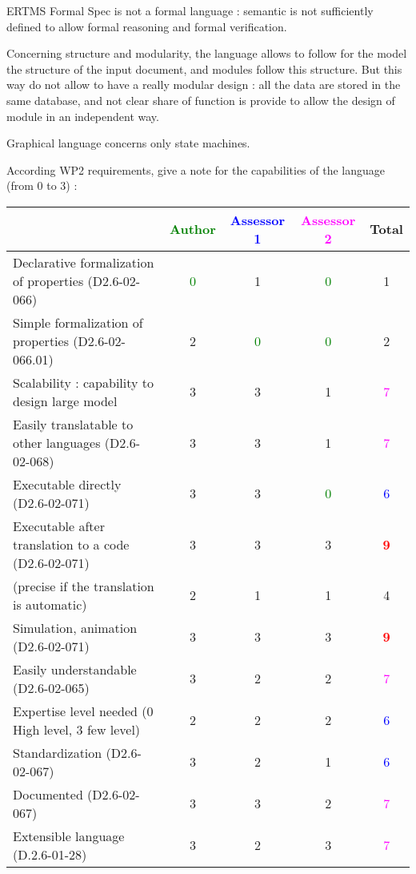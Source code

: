 \begin{assessor2}
ERTMS Formal Spec is not a formal language :  semantic is not sufficiently defined to allow formal  reasoning and formal verification.

Concerning structure and modularity, the language allows to follow for the model the structure of the input document, and modules follow this structure. But this way do not allow to have a really modular design :  all the data are stored in the same database, and not clear share of function is provide to allow the design of module in an independent way.

Graphical language concerns only state machines.
\end{assessor2}

According WP2 requirements, give a note for the capabilities of the language (from 0 to 3) :

\begin{tabular}{|l | c | c | c | c|}
\hline
& \textcolor{green}{Author} & \textcolor{blue}{Assessor 1} & \textcolor{magenta}{Assessor 2} & Total \\
\hline
Declarative formalization of properties (D2.6-02-066) & \textcolor{green}{0} & 1     & \textcolor{green}{0} & 1     \\
\hline
Simple formalization of properties (D2.6-02-066.01) & 2     & \textcolor{green}{0} & \textcolor{green}{0} & 2     \\
\hline
Scalability : capability to design large model & 3     & 3     & 1     & \textcolor{magenta}{7} \\
\hline
Easily translatable to other languages (D2.6-02-068) & 3     & 3     & 1     & \textcolor{magenta}{7} \\
\hline
Executable directly (D2.6-02-071) & 3     & 3     & \textcolor{green}{0} & \textcolor{blue}{6} \\
\hline
Executable after translation to a code (D2.6-02-071) & 3     & 3     & 3     & \textcolor{red}{\textbf{9}} \\
(precise if the translation is automatic) & 2     & 1     & 1     & 4     \\
\hline
Simulation, animation (D2.6-02-071) & 3     & 3     & 3     & \textcolor{red}{\textbf{9}} \\
\hline
Easily understandable (D2.6-02-065) & 3     & 2     & 2     & \textcolor{magenta}{7} \\
\hline
Expertise level needed (0 High level, 3 few level) & 2     & 2     & 2     & \textcolor{blue}{6} \\
\hline
Standardization (D2.6-02-067) & 3     & 2     & 1     & \textcolor{blue}{6} \\
\hline
Documented (D2.6-02-067) & 3     & 3     & 2     & \textcolor{magenta}{7} \\
\hline
Extensible language (D.2.6-01-28) & 3     & 2     & 3     & \textcolor{magenta}{7} \\
\hline
\end{tabular}

